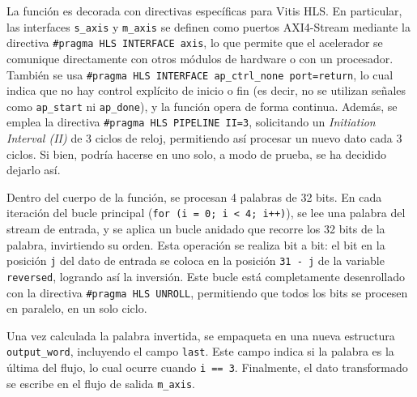 \begin{adjustwidth}{1.5cm}{}
La función es decorada con directivas específicas para Vitis HLS. En particular, las interfaces \texttt{s\_axis} y \texttt{m\_axis} se definen como puertos AXI4-Stream mediante la directiva \texttt{\#pragma HLS INTERFACE axis}, lo que permite que el acelerador se comunique directamente con otros módulos de hardware o con un procesador. También se usa \texttt{\#pragma HLS INTERFACE ap\_ctrl\_none port=return}, lo cual indica que no hay control explícito de inicio o fin (es decir, no se utilizan señales como \texttt{ap\_start} ni \texttt{ap\_done}), y la función opera de forma continua. Además, se emplea la directiva \texttt{\#pragma HLS PIPELINE II=3}, solicitando un \emph{Initiation Interval (II)} de 3 ciclos de reloj, permitiendo así procesar un nuevo dato cada 3 ciclos. Si bien, podría hacerse en uno solo, a modo de prueba, se ha decidido dejarlo así.

Dentro del cuerpo de la función, se procesan 4 palabras de 32 bits. En cada iteración del bucle principal (\texttt{for (i = 0; i < 4; i++)}), se lee una palabra del stream de entrada, y se aplica un bucle anidado que recorre los 32 bits de la palabra, invirtiendo su orden. Esta operación se realiza bit a bit: el bit en la posición \texttt{j} del dato de entrada se coloca en la posición \texttt{31 - j} de la variable \texttt{reversed}, logrando así la inversión. Este bucle está completamente desenrollado con la directiva \texttt{\#pragma HLS UNROLL}, permitiendo que todos los bits se procesen en paralelo, en un solo ciclo.

Una vez calculada la palabra invertida, se empaqueta en una nueva estructura \texttt{output\_word}, incluyendo el campo \texttt{last}. Este campo indica si la palabra es la última del flujo, lo cual ocurre cuando \texttt{i == 3}. Finalmente, el dato transformado se escribe en el flujo de salida \texttt{m\_axis}.

\end{adjustwidth}

\vspace{0.4em} %

